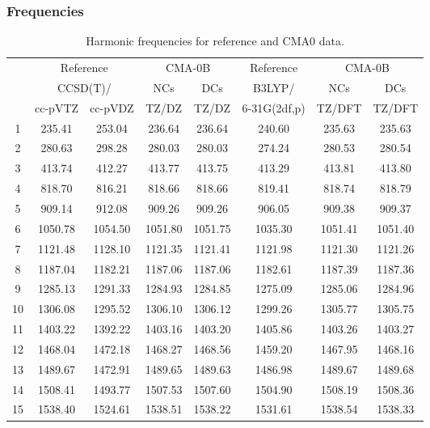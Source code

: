 \documentclass[10pt,oneside]{article}
\begin{document}
\subsubsection*{Frequencies}
\begin{table}[h!]
\centering
\caption{Harmonic frequencies for reference and CMA0 data.}
\begin{tabular}{cccccccc}
\toprule
{} & \multicolumn{2}{c}{Reference} & \multicolumn{2}{c}{CMA-0B} &    Reference & \multicolumn{2}{c}{CMA-0B} \\
{} & \multicolumn{2}{c}{CCSD(T)/} &     NCs &     DCs &       B3LYP/ &     NCs &     DCs \\
{} &   cc-pVTZ & cc-pVDZ &   TZ/DZ &   TZ/DZ & 6-31G(2df,p) &  TZ/DFT &  TZ/DFT \\
\midrule
1  &    235.41 &  253.04 &  236.64 &  236.64 &       240.60 &  235.63 &  235.63 \\
2  &    280.63 &  298.28 &  280.03 &  280.03 &       274.24 &  280.53 &  280.54 \\
3  &    413.74 &  412.27 &  413.77 &  413.75 &       413.29 &  413.81 &  413.80 \\
4  &    818.70 &  816.21 &  818.66 &  818.66 &       819.41 &  818.74 &  818.79 \\
5  &    909.14 &  912.08 &  909.26 &  909.26 &       906.05 &  909.38 &  909.37 \\
6  &   1050.78 & 1054.50 & 1051.80 & 1051.75 &      1035.30 & 1051.41 & 1051.40 \\
7  &   1121.48 & 1128.10 & 1121.35 & 1121.41 &      1121.98 & 1121.30 & 1121.26 \\
8  &   1187.04 & 1182.21 & 1187.06 & 1187.06 &      1182.61 & 1187.39 & 1187.36 \\
9  &   1285.13 & 1291.33 & 1284.93 & 1284.85 &      1275.09 & 1285.06 & 1284.96 \\
10 &   1306.08 & 1295.52 & 1306.10 & 1306.12 &      1299.26 & 1305.77 & 1305.75 \\
11 &   1403.22 & 1392.22 & 1403.16 & 1403.20 &      1405.86 & 1403.26 & 1403.27 \\
12 &   1468.04 & 1472.18 & 1468.27 & 1468.56 &      1459.20 & 1467.95 & 1468.16 \\
13 &   1489.67 & 1472.91 & 1489.65 & 1489.63 &      1486.98 & 1489.67 & 1489.68 \\
14 &   1508.41 & 1493.77 & 1507.53 & 1507.60 &      1504.90 & 1508.19 & 1508.36 \\
15 &   1538.40 & 1524.61 & 1538.51 & 1538.22 &      1531.61 & 1538.54 & 1538.33 \\

\end{tabular}
\end{table}
\end{document}
